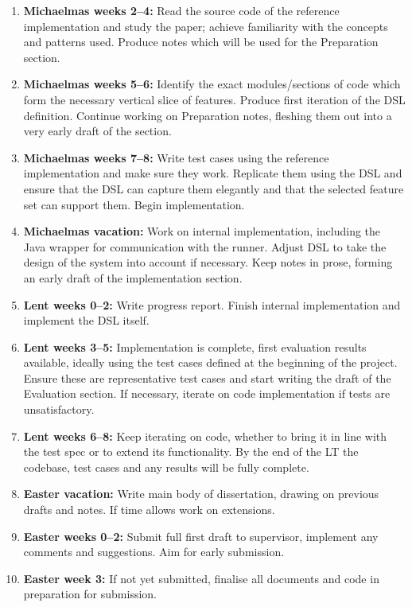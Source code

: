 \documentclass[11pt]{scrartcl}
\begin{document}
\begin{enumerate}

\item \textbf{Michaelmas weeks 2--4:} Read the source code of the reference implementation and study the paper; achieve familiarity with the concepts and patterns used. Produce notes which will be used for the Preparation section.

\item \textbf{Michaelmas weeks 5--6:} Identify the exact modules/sections of code which form the necessary vertical slice of features. Produce first iteration of the DSL definition. Continue working on Preparation notes, fleshing them out into a very early draft of the section.

\item \textbf{Michaelmas weeks 7--8:} Write test cases using the reference implementation and make sure they work. Replicate them using the DSL and ensure that the DSL can capture them elegantly and that the selected feature set can support them. Begin implementation. 

\item \textbf{Michaelmas vacation:} Work on internal implementation, including the Java wrapper for communication with the runner. Adjust DSL to take the design of the system into account if necessary. Keep notes in prose, forming an early draft of the implementation section.

\item \textbf{Lent weeks 0--2:} Write progress report. Finish internal implementation and implement the DSL itself.

\item \textbf{Lent weeks 3--5:} Implementation is complete, first evaluation results available, ideally using the test cases defined at the beginning of the project. Ensure these are representative test cases and start writing the draft of the Evaluation section. If necessary, iterate on code implementation if tests are unsatisfactory.

\item \textbf{Lent weeks 6--8:} Keep iterating on code, whether to bring it in line with the test spec or to extend its functionality. By the end of the LT the codebase, test cases and any results will be fully complete.

\item \textbf{Easter vacation:} Write main body of dissertation, drawing on previous drafts and notes. If time allows work on extensions.

\item \textbf{Easter weeks 0--2:} Submit full first draft to supervisor, implement any comments and suggestions. Aim for early submission.

\item \textbf{Easter week 3:} If not yet submitted, finalise all documents and code in preparation for submission.

\end{enumerate}

\printbibliography
\end{document}
